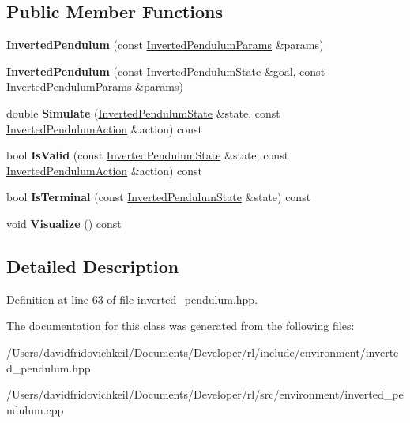 \subsection*{Public Member Functions}
\begin{DoxyCompactItemize}
\item 
\hypertarget{classrl_1_1_inverted_pendulum_a56c648ddb05442b70cf11c1f87937160}{}\label{classrl_1_1_inverted_pendulum_a56c648ddb05442b70cf11c1f87937160} 
{\bfseries Inverted\+Pendulum} (const \hyperlink{structrl_1_1_inverted_pendulum_params}{Inverted\+Pendulum\+Params} \&params)
\item 
\hypertarget{classrl_1_1_inverted_pendulum_adbe6ba1394c1c681e226b92c2140a0a3}{}\label{classrl_1_1_inverted_pendulum_adbe6ba1394c1c681e226b92c2140a0a3} 
{\bfseries Inverted\+Pendulum} (const \hyperlink{structrl_1_1_inverted_pendulum_state}{Inverted\+Pendulum\+State} \&goal, const \hyperlink{structrl_1_1_inverted_pendulum_params}{Inverted\+Pendulum\+Params} \&params)
\item 
\hypertarget{classrl_1_1_inverted_pendulum_a540a4c2bc14cb9bf8b70b8e7aa664c02}{}\label{classrl_1_1_inverted_pendulum_a540a4c2bc14cb9bf8b70b8e7aa664c02} 
double {\bfseries Simulate} (\hyperlink{structrl_1_1_inverted_pendulum_state}{Inverted\+Pendulum\+State} \&state, const \hyperlink{structrl_1_1_inverted_pendulum_action}{Inverted\+Pendulum\+Action} \&action) const
\item 
\hypertarget{classrl_1_1_inverted_pendulum_a090d67a70e2ea6aca1f811484e8202bd}{}\label{classrl_1_1_inverted_pendulum_a090d67a70e2ea6aca1f811484e8202bd} 
bool {\bfseries Is\+Valid} (const \hyperlink{structrl_1_1_inverted_pendulum_state}{Inverted\+Pendulum\+State} \&state, const \hyperlink{structrl_1_1_inverted_pendulum_action}{Inverted\+Pendulum\+Action} \&action) const
\item 
\hypertarget{classrl_1_1_inverted_pendulum_abe00c9d3c42b7c4f794f9b24976c7df9}{}\label{classrl_1_1_inverted_pendulum_abe00c9d3c42b7c4f794f9b24976c7df9} 
bool {\bfseries Is\+Terminal} (const \hyperlink{structrl_1_1_inverted_pendulum_state}{Inverted\+Pendulum\+State} \&state) const
\item 
\hypertarget{classrl_1_1_inverted_pendulum_a808e9d514a68c758f445de58330068e4}{}\label{classrl_1_1_inverted_pendulum_a808e9d514a68c758f445de58330068e4} 
void {\bfseries Visualize} () const
\end{DoxyCompactItemize}


\subsection{Detailed Description}


Definition at line 63 of file inverted\+\_\+pendulum.\+hpp.



The documentation for this class was generated from the following files\+:\begin{DoxyCompactItemize}
\item 
/\+Users/davidfridovichkeil/\+Documents/\+Developer/rl/include/environment/inverted\+\_\+pendulum.\+hpp\item 
/\+Users/davidfridovichkeil/\+Documents/\+Developer/rl/src/environment/inverted\+\_\+pendulum.\+cpp\end{DoxyCompactItemize}
